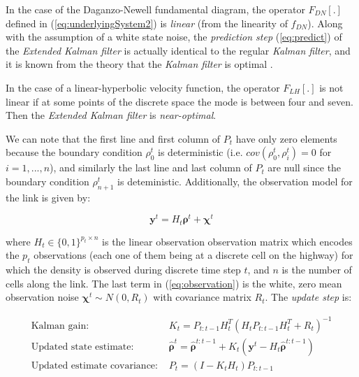 \documentclass[11pt]{article}
\numberwithin{equation}{section}
\numberwithin{figure}{section}
\numberwithin{table}{section}
\begin{document}
In the case of the Daganzo-Newell fundamental diagram, the operator $F_{DN}[.]$ defined in (\ref{eq:underlyingSystem2}) is \textit{linear} (from the linearity of $f_{DN}$). Along with the assumption of a white state noise, the \textit{prediction step} (\ref{eq:predict}) of the \textit{Extended Kalman filter} is actually identical to the regular \textit{Kalman filter}, and it is known from the theory that the \textit{Kalman filter} is optimal \cite{Anderson2005}.

In the case of a linear-hyperbolic velocity function, the operator $F_{LH}[.]$ is not linear if at some points of the discrete space the mode is between four and seven. Then the \textit{Extended Kalman filter} is \textit{near-optimal}.

We can note that the first line and first column of $P_{t}$ have only zero elements because the boundary condition $\rho^{t}_{0}$ is deterministic (i.e. $cov(\rho^{t}_{0},\rho^{t}_{i})=0$ for $i=1,...,n$), and similarly the last line and last column of $P_{t}$ are null since the boundary condition $\rho^{t}_{n+1}$ is deteministic. Additionally, the observation model for the link is given by:

\begin{equation}
\boldsymbol y^{t} = H_{t}\boldsymbol\rho^{t} + \boldsymbol\chi^{t}
\end{equation}

\noindent where $H_{t}\in \{ 0,1 \}^{p_{t}\times n}$ is the linear observation observation matrix which encodes the $p_{t}$ observations (each one of them being at a discrete cell on the highway) for which the density is observed during discrete time step $t$, and $n$ is the number of cells along the link. The last term in (\ref{eq:observation}) is the white, zero mean observation noise $\boldsymbol\chi^{t} \sim N(0,R_{t})$ with covariance matrix $R_{t}$. The \textit{update step} is:

\begin{equation}
\begin{array}{ll}
\text{Kalman gain: } & K_{t} = P_{t:t-1}H_{t}^{T}\left(H_{t}P_{t:t-1}H_{t}^{T}+R_{t}\right)^{-1}\\
\text{Updated state estimate: } & \hat{\boldsymbol\rho}^{t} = \hat{\boldsymbol\rho}^{t:t-1} + K_{t}(\boldsymbol y^{t} - H_{t}\hat{\boldsymbol\rho}^{t:t-1})\\
\text{Updated estimate covariance: } & P_{t} = (I - K_{t}H_{t})P_{t:t-1}
\end{array}
\end{equation}
\end{document}
